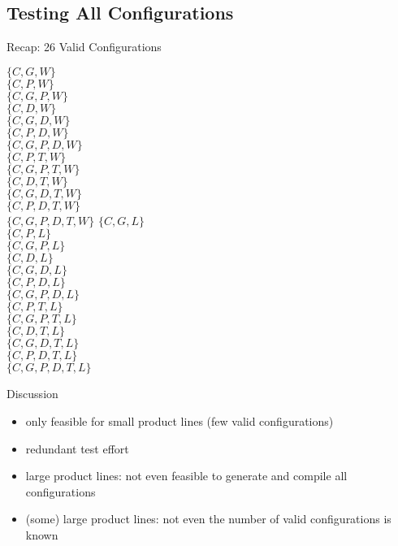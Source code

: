 
\subsection{Testing All Configurations}
\begin{frame}{\myframetitle}
	\begin{mycolumns}[forget]
		\centering\featureDiagramConfigurableDatabase
		
		\begin{example}{Recap: 26 Valid Configurations\mysource{\lecturemodeling}}
			\footnotesize
			\begin{mycolumns}[animation=none]
				$\{C,G,W\}$\\
				$\{C,P,W\}$\\
				$\{C,G,P,W\}$\\
				$\{C,D,W\}$\\
				$\{C,G,D,W\}$\\
				$\{C,P,D,W\}$\\
				$\{C,G,P,D,W\}$\\
				$\{C,P,T,W\}$\\
				$\{C,G,P,T,W\}$\\
				$\{C,D,T,W\}$\\
				$\{C,G,D,T,W\}$\\
				$\{C,P,D,T,W\}$\\
				$\{C,G,P,D,T,W\}$
			\mynextcolumn
				$\{C,G,L\}$\\
				$\{C,P,L\}$\\
				$\{C,G,P,L\}$\\
				$\{C,D,L\}$\\
				$\{C,G,D,L\}$\\
				$\{C,P,D,L\}$\\
				$\{C,G,P,D,L\}$\\
				$\{C,P,T,L\}$\\
				$\{C,G,P,T,L\}$\\
				$\{C,D,T,L\}$\\
				$\{C,G,D,T,L\}$\\
				$\{C,P,D,T,L\}$\\
				$\{C,G,P,D,T,L\}$
			\end{mycolumns}
		\end{example}
	\mynextcolumn
		\vspace{-7mm}
		\begin{note}{Discussion}
			\begin{itemize}
				\setlength\itemsep{.5em}
				\item only feasible for small product lines (few valid configurations)
				\item redundant test effort
				\item large product lines: not even feasible to generate and compile all configurations
				\item (some) large product lines: not even the number of valid configurations is known
			\end{itemize}
		\end{note}
	\end{mycolumns}
\end{frame}

